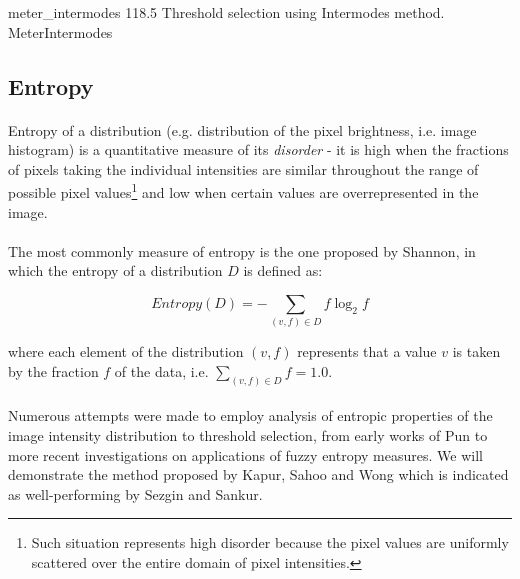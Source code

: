 \thresholdFigure
{meter_intermodes}
{118.5}
{Threshold selection using Intermodes method.}
{MeterIntermodes}




\subsection{Entropy}

\paragraph*{}
Entropy of a distribution (e.g. distribution of the pixel brightness, i.e. image histogram) is a quantitative measure of its \textit{disorder} - it is high when the fractions of pixels taking the individual intensities are similar throughout the range of possible pixel values\footnote{Such situation represents high disorder because the pixel values are uniformly scattered over the entire domain of pixel intensities.} and low when certain values are overrepresented in the image.

\paragraph*{}
The most commonly measure of entropy is the one proposed by Shannon, in which the entropy of a distribution  $D$ is defined as:

\[
	Entropy(D) = - \sum_{(v,f) \in D}f \log_2{f}
\]

where each element of the distribution $(v,f)$ represents that a value $v$ is taken by the fraction $f$ of the data, i.e. $\sum_{(v,f) \in D} f = 1.0$.

\paragraph*{}
Numerous attempts were made to employ analysis of entropic properties of the image intensity distribution to threshold selection, from early works of Pun to more recent investigations on applications of fuzzy entropy measures. We will demonstrate the method proposed\cite{KapurSahooWong85} by Kapur, Sahoo and Wong which is indicated\cite{SezginSankur04} as well-performing by Sezgin and Sankur.

